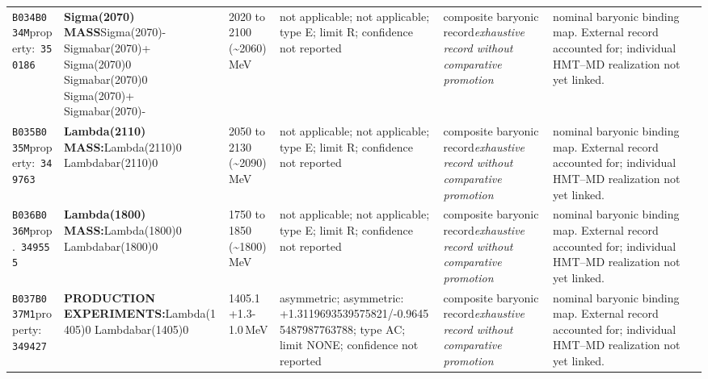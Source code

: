 \begin{landscape}
\begin{longtable}{L{1.85cm}L{4.45cm}L{2.35cm}L{4.05cm}L{3.35cm}L{7.15cm}}
\texttt{B034}\newline \texttt{B034M}\newline property:\ \texttt{350186} & \textbf{Sigma(2070) MASS}\newline Sigma(2070)- \textbar{}\allowbreak{} Sigmabar(2070)+ \textbar{}\allowbreak{} Sigma(2070)0 \textbar{}\allowbreak{} Sigmabar(2070)0 \textbar{}\allowbreak{} Sigma(2070)+ \textbar{}\allowbreak{} Sigmabar(2070)- & 2020 to 2100 (\textasciitilde{}2060)\,MeV & not applicable; not applicable; type E; limit R; confidence not reported & composite baryonic record\newline \emph{exhaustive record without comparative promotion} & nominal baryonic binding map. External record accounted for; individual HMT--MD realization not yet linked. \\
\texttt{B035}\newline \texttt{B035M}\newline property:\ \texttt{349763} & \textbf{Lambda(2110) MASS:}\newline Lambda(2110)0 \textbar{}\allowbreak{} Lambdabar(2110)0 & 2050 to 2130 (\textasciitilde{}2090)\,MeV & not applicable; not applicable; type E; limit R; confidence not reported & composite baryonic record\newline \emph{exhaustive record without comparative promotion} & nominal baryonic binding map. External record accounted for; individual HMT--MD realization not yet linked. \\
\texttt{B036}\newline \texttt{B036M}\newline prop.\ \texttt{349555} & \textbf{Lambda(1800) MASS:}\newline Lambda(1800)0 \textbar{}\allowbreak{} Lambdabar(1800)0 & 1750 to 1850 (\textasciitilde{}1800)\,MeV & not applicable; not applicable; type E; limit R; confidence not reported & composite baryonic record\newline \emph{exhaustive record without comparative promotion} & nominal baryonic binding map. External record accounted for; individual HMT--MD realization not yet linked. \\
\texttt{B037}\newline \texttt{B037M1}\newline property:\ \texttt{349427} & \textbf{PRODUCTION EXPERIMENTS:}\newline Lambda(1405)0 \textbar{}\allowbreak{} Lambdabar(1405)0 & 1405.1+1.3-1.0\,MeV & asymmetric; asymmetric: +1.3119693539575821/-0.96455487987763788; type AC; limit NONE; confidence not reported & composite baryonic record\newline \emph{exhaustive record without comparative promotion} & nominal baryonic binding map. External record accounted for; individual HMT--MD realization not yet linked. \\

\end{longtable}
\end{landscape}
